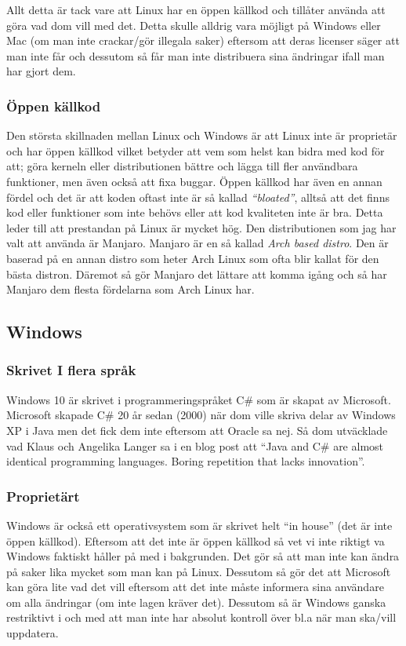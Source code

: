 \documentclass[12pt, a4paper]{report}
\begin{document}
   Allt detta är tack vare att Linux har en öppen källkod och tillåter använda att göra vad dom vill med det. Detta skulle alldrig vara möjligt på Windows eller Mac (om man inte crackar/gör illegala saker) eftersom att deras licenser säger att man inte får och dessutom så får man inte distribuera sina ändringar ifall man har gjort dem.

   \subsubsection{Öppen källkod}


   Den största skillnaden mellan Linux och Windows är att Linux inte är proprietär och har öppen källkod vilket betyder att vem som helst kan bidra med kod för att; göra kerneln eller distributionen bättre och lägga till fler användbara funktioner, men även också att fixa buggar. Öppen källkod har även en annan fördel och det är att koden oftast inte är så kallad \textit{``bloated''}, alltså att det finns kod eller funktioner som inte behövs eller att kod kvaliteten inte är bra. Detta leder till att prestandan på Linux är mycket hög.
    \vspace{1cm}
   Den distributionen som jag har valt att använda är Manjaro\cite{manjaro}. Manjaro är en så kallad \textit{Arch based distro}. Den är baserad på en annan distro som heter Arch Linux som ofta blir kallat för den bästa distron. Däremot så gör Manjaro det lättare att komma igång och så har Manjaro dem flesta fördelarna som Arch Linux har.

   \subsection{Windows}


    \subsubsection{Skrivet I flera språk}
    
    Windows 10 är skrivet i programmeringspråket C\# som är skapat av Microsoft\cite{c}. Microsoft skapade C\# 20 år sedan (2000) när dom ville skriva delar av Windows XP i Java men det fick dem inte eftersom att Oracle sa nej. Så dom utväcklade vad Klaus och Angelika Langer sa i en blog post att ``Java and C\# are almost identical programming languages. Boring repetition that lacks innovation''.\cite{cquote}  
    

    \subsubsection{Proprietärt}
    Windows är också ett operativsystem som är skrivet helt ``in house'' (det är inte öppen källkod).
    Eftersom att det inte är öppen källkod så vet vi inte riktigt va Windows faktiskt håller på med i bakgrunden. Det gör så att man inte kan ändra på saker lika mycket som man kan på Linux. Dessutom så gör det att Microsoft kan göra lite vad det vill eftersom att det inte måste informera sina användare om alla ändringar (om inte lagen kräver det). Dessutom så är Windows ganska restriktivt i och med att man inte har absolut kontroll över bl.a när man ska/vill uppdatera.
\end{document}
